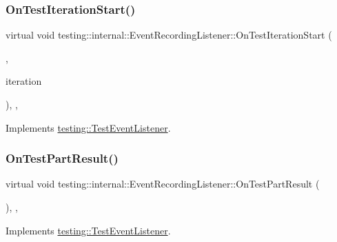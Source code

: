 \subsubsection{\texorpdfstring{On\+Test\+Iteration\+Start()}{OnTestIterationStart()}}
{\footnotesize\ttfamily virtual void testing\+::internal\+::\+Event\+Recording\+Listener\+::\+On\+Test\+Iteration\+Start (\begin{DoxyParamCaption}\item[{const \hyperlink{classtesting_1_1_unit_test}{Unit\+Test} \&}]{,  }\item[{int}]{iteration }\end{DoxyParamCaption})\hspace{0.3cm}{\ttfamily [inline]}, {\ttfamily [protected]}, {\ttfamily [virtual]}}



Implements \hyperlink{classtesting_1_1_test_event_listener_a60cc09b7907cb329d152eb5e7133bdeb}{testing\+::\+Test\+Event\+Listener}.

\mbox{\label{classtesting_1_1internal_1_1_event_recording_listener_a4a6685d894923f1691ad9c6a4311470e}} 
\subsubsection{\texorpdfstring{On\+Test\+Part\+Result()}{OnTestPartResult()}}
{\footnotesize\ttfamily virtual void testing\+::internal\+::\+Event\+Recording\+Listener\+::\+On\+Test\+Part\+Result (\begin{DoxyParamCaption}\item[{const \hyperlink{classtesting_1_1_test_part_result}{Test\+Part\+Result} \&}]{ }\end{DoxyParamCaption})\hspace{0.3cm}{\ttfamily [inline]}, {\ttfamily [protected]}, {\ttfamily [virtual]}}



Implements \hyperlink{classtesting_1_1_test_event_listener_a054f8705c883fa120b91473aff38f2ee}{testing\+::\+Test\+Event\+Listener}.

\mbox{\label{classtesting_1_1internal_1_1_event_recording_listener_a21fe9c3c519c4599a48b16ddfb734aa3}} 
